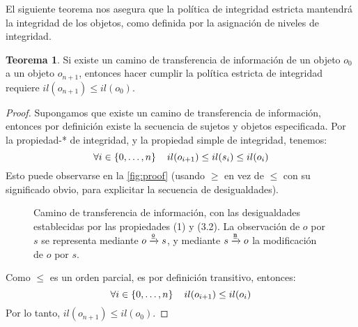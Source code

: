\documentclass[spanish]{article}
\theoremstyle{definition}
\newtheorem{thm}{Teorema}
\begin{document}
El siguiente teorema nos asegura que la política de integridad estricta
mantendrá la integridad de los objetos, como definida por la asignación de
niveles de integridad.

\begin{thm}
Si existe un camino de transferencia de información de un objeto $o_0$ a un
objeto $o_{n+1}$, entonces hacer cumplir la política estricta de integridad requiere
$il(o_{n+1}) \leq il(o_0)$.
\end{thm}

\begin{proof}
Supongamos que existe un camino de transferencia de información, entonces por
definición existe la secuencia de sujetos y objetos especificada. Por la
propiedad-* de integridad, y la propiedad simple de integridad, tenemos:
\[\forall i \in \{0,\dots,n\}\hspace{.4cm} il(o_{i+1}) \leq il(s_i) \leq il(o_i) \]
Esto puede observarse en la \autoref{fig:proof} (usando $\geq$ en vez de $\leq$ con
su significado obvio, para explicitar la secuencia de desigualdades).
\begin{figure}[htp]
  \centering
\begin{minipage}{.9\textwidth}
  \centering
  \caption{\label{fig:proof} Camino de transferencia de información, con las
desigualdades establecidas por las propiedades (1) y (3.2). La observación de
$o$ por $s$ se representa mediante $o \xrightarrow{\underline{\texttt{o}}} s$, y mediante $s
\xrightarrow{\underline{\texttt{m}}} o$ la modificación de $o$ por $s$.}
\end{minipage}
\end{figure}

Como $\leq$ es un orden parcial, es por definición transitivo, entonces:
\[\forall i \in \{0,\dots,n\}\hspace{.4cm} il(o_{i+1}) \leq il(o_i) \]
Por lo tanto, $il(o_{n+1}) \leq il(o_0)$.
\end{proof}
\end{document}
